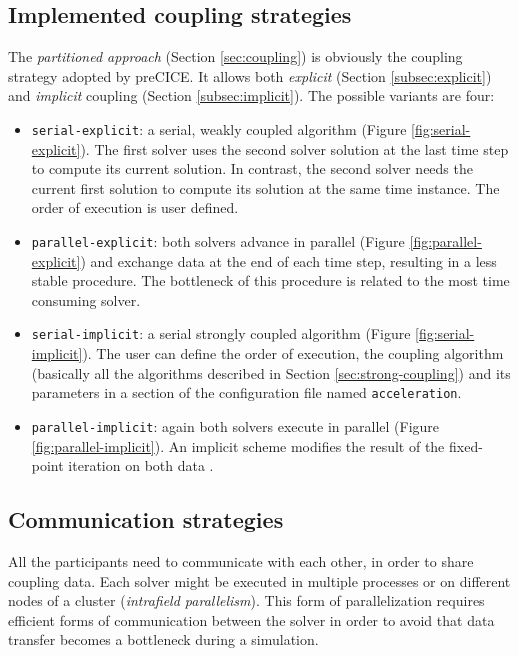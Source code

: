\subsection{Implemented coupling strategies}
\label{sec:pc-coupling}

The \textit{partitioned approach} (Section \ref{sec:coupling}) is obviously the coupling strategy adopted by preCICE. It allows both \textit{explicit} (Section \ref{subsec:explicit}) and \textit{implicit} coupling (Section \ref{subsec:implicit}). The possible variants are four:

\begin{itemize}
	\item \texttt{serial-explicit}: a serial, weakly coupled algorithm (Figure \ref{fig:serial-explicit}). The first solver uses the second solver solution at the last time step to compute its current solution. In contrast, the second solver needs the current first solution to compute its solution at the same time instance. The order of execution is user defined.
	\item \texttt{parallel-explicit}: both solvers advance in parallel (Figure \ref{fig:parallel-explicit}) and exchange data at the end of each time step, resulting in a less stable procedure. The bottleneck of this procedure is related to the most time consuming solver.
	\item \texttt{serial-implicit}: a serial strongly coupled algorithm (Figure \ref{fig:serial-implicit}). The user can define the order of execution, the coupling algorithm (basically all the algorithms described in Section \ref{sec:strong-coupling}) and its parameters in a section of the configuration file named \texttt{acceleration}.
	\item \texttt{parallel-implicit}: again both solvers execute in parallel (Figure \ref{fig:parallel-implicit}). An implicit scheme modifies the result of the fixed-point iteration on both data \cite{mehl2016parallel}. 
\end{itemize}



\subsection{Communication strategies}
\label{sec:pc-comm}

All the participants need to communicate with each other, in order to share coupling data.
Each solver might be executed in multiple processes or on different nodes of a cluster (\textit{intrafield parallelism}).
This form of parallelization requires efficient forms of communication between the solver in order to avoid that data transfer becomes a bottleneck during a simulation.

